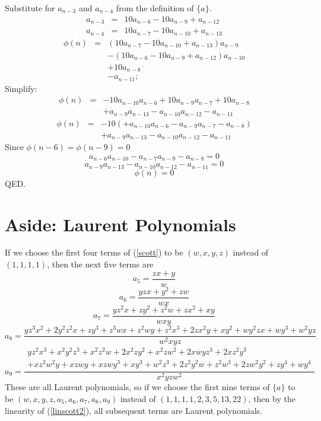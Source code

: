 \documentclass[10pt]{article}
\begin{document}
Substitute for $a_{n-3}$ and $a_{n-4}$ from the definition of $\{a\}$.
\begin{eqnarray*}
	a_{n-3} &=& 10  a_{n-6} - 10  a_{n-9}  + a_{n-12} \\
	a_{n-4} &=& 10  a_{n-7} - 10  a_{n-10} + a_{n-13}\end{eqnarray*}
\begin{eqnarray*}
	\phi(n) &=& (10  a_{n-7} - 10  a_{n-10} + a_{n-13} )  a_{n - 9} \\
	        && - (10  a_{n-6} - 10  a_{n-9}  + a_{n-12} ) a_{n - 10} \\
	        && + 10  a_{n - 8} \\
	        && - a_{n - 11} ;
\end{eqnarray*}
Simplify:
\begin{eqnarray*}
	\phi(n) &=& - 10 a_{n - 10}  a_{n - 6}  + 10 a_{n - 9}  a_{n -
		7}  + 10 a_{n - 8} \\ 
		&&  + a_{n - 9}  a_{n - 13} - a_{n - 10}  a_{n - 12} -
		a_{n - 11} 
\end{eqnarray*}
\begin{eqnarray*}
	\phi(n) &=& - 10  ( + a_{n - 10}  a_{n - 6} - a_{n - 9}  a_{n - 7} 
		  - a_{n - 8} )\\
		&& + a_{n - 9}  a_{n - 13} - a_{n - 10}  a_{n - 12} - a_{n - 11}
\end{eqnarray*}
Since $\phi(n-6) = \phi(n-9) = 0$
\[	a_{n-6} a_{n-10} - a_{n-7} a_{n-9} - a_{n-8} = 0 \]
\[	a_{n-9} a_{n-13} - a_{n-10} a_{n-12} - a_{n-11} = 0 \]
\[	\phi(n) = 0 \]
QED.

\section{Aside: Laurent Polynomials}

If we choose the first four terms of (\ref{scott}) to be $(w,x,y,z)$
instead of $(1,1,1,1)$, then the next five terms are
\[a_5=\frac{z x + y}{w}\]
\[a_6=\frac{yzx+y^2+zw}{wx}\]
\[a_7=\frac{yz^2x+zy^2+z^2w+zx^2+xy}{wxy}\]
\[a_8=\frac{yz^3x^2+2y^2z^2x+zy^3+z^3wx+z^2wy+z^2x^3+2zx^2y+xy^2+wy^2zx+wy^3+w^2yz}
{w^2xyz}\]
\[a_9=\frac{
\begin{array}{c}
yz^2x^3+x^2y^2z^3+x^2z^2w+2x^2zy^2+x^2zw^2+2xwyz^3+2xz^2y^3\\
+xz^2w^2y+xzwy+xzwy^3+xy^3+w^2z^3+2z^2y^2w+z^2w^3+2zw^2y^2+zy^4+wy^4
\end{array}
}{x^2yzw^2}\]
These are all Laurent polynomials, so if we choose the first nine
terms of $\{a\}$ to be $(w,x,y,z,a_5,a_6,a_7,a_8,a_9)$
instead of $(1, 1, 1, 1, 2, 3, 5, 13, 22)$, then by the
linearity of (\ref{linscott2}), all subsequent terms are Laurent
polynomials. 
\end{document}
